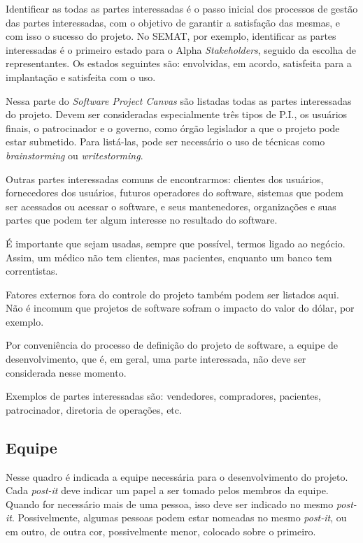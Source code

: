 \documentclass[a4]{report}
\begin{document}
Identificar as todas as partes interessadas é o passo inicial dos processos de gestão das partes interessadas\citep{jacobson_essentials_2019,pmbok:6}, com o objetivo de garantir a satisfação das mesmas, e com isso o sucesso do projeto. No SEMAT, por exemplo, identificar as partes interessadas é o primeiro estado para o Alpha \textit{Stakeholders}, seguido da escolha de representantes\citep{jacobson_essentials_2019}.  Os estados seguintes são: envolvidas, em acordo, satisfeita para a implantação e satisfeita com o uso\citep{jacobson_essentials_2019}.

Nessa parte do \textit{Software Project Canvas} são listadas todas as partes interessadas  do projeto. Devem ser consideradas especialmente três tipos de P.I., os usuários finais, o patrocinador e o governo, como órgão legislador a que o projeto pode estar submetido. Para listá-las, pode ser necessário o uso de técnicas como \textit{brainstorming}\citep{tracy:2015} ou \textit{writestorming}\citep{gray:2010}.

Outras partes interessadas comuns de encontrarmos: clientes dos usuários, fornecedores dos usuários, futuros operadores do software, sistemas que podem ser acessados ou acessar o software, e seus mantenedores, organizações e suas partes que podem ter algum interesse no resultado do software.

É importante que sejam usadas, sempre que possível, termos ligado ao negócio. Assim, um médico não tem clientes, mas pacientes, enquanto um banco tem correntistas.

Fatores externos fora do controle do projeto também podem ser listados aqui. Não é incomum que projetos de software sofram o impacto do valor do dólar, por exemplo.

Por conveniência do processo de definição do projeto de software, a equipe de desenvolvimento, que é, em geral, uma parte interessada, não deve ser considerada nesse momento.

Exemplos de partes interessadas são: vendedores, compradores, pacientes, patrocinador, diretoria de operações, etc.

\subsection{Equipe}

Nesse quadro é indicada a equipe necessária para o desenvolvimento do projeto. Cada \textit{post-it} deve indicar um papel a ser tomado pelos membros da equipe. Quando for necessário mais de uma pessoa, isso deve ser indicado no mesmo \textit{post-it}. Possivelmente, algumas pessoas podem estar nomeadas no mesmo \textit{post-it}, ou em outro, de outra cor, possivelmente menor, colocado sobre o primeiro.
\end{document}
